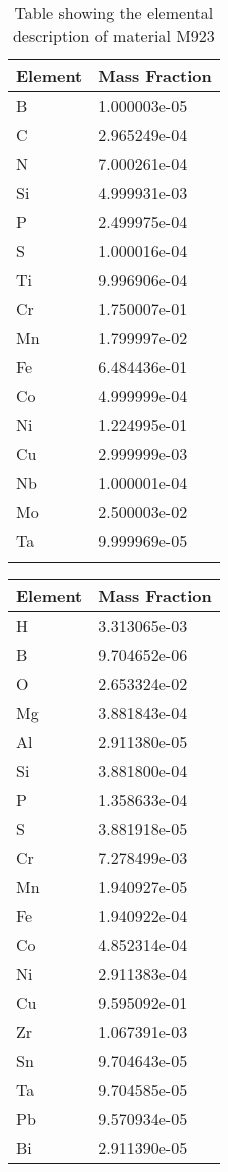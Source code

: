\begin{centering}
\begin{longtable}[ht!]
\caption{Table showing the elemental description of material M937}
\label{table:material_UppWaterPipes}
\end{longtable}
\clearpage

\begin{longtable}[ht!]
{ p{} | p{} }
\hline
Element & Mass Fraction\\
\hline
B &  1.000003e-05\\
C &  2.965249e-04\\
N &  7.000261e-04\\
Si &  4.999931e-03\\
P &  2.499975e-04\\
S &  1.000016e-04\\
Ti &  9.996906e-04\\
Cr &  1.750007e-01\\
Mn &  1.799997e-02\\
Fe &  6.484436e-01\\
Co &  4.999999e-04\\
Ni &  1.224995e-01\\
Cu &  2.999999e-03\\
Nb &  1.000001e-04\\
Mo &  2.500003e-02\\
Ta &  9.999969e-05\\

\caption{Table showing the elemental description of material M923}
\label{table:material_EppValves}
\end{longtable}
\clearpage

\begin{longtable}[ht!]
{ p{} | p{} }
\hline
Element & Mass Fraction\\
\hline

H &  3.313065e-03\\
B &  9.704652e-06\\
O &  2.653324e-02\\
Mg &  3.881843e-04\\
Al &  2.911380e-05\\
Si &  3.881800e-04\\
P &  1.358633e-04\\
S &  3.881918e-05\\
Cr &  7.278499e-03\\
Mn &  1.940927e-05\\
Fe &  1.940922e-04\\
Co &  4.852314e-04\\
Ni &  2.911383e-04\\
Cu &  9.595092e-01\\
Zr &  1.067391e-03\\
Sn &  9.704643e-05\\
Ta &  9.704585e-05\\
Pb &  9.570934e-05\\
Bi &  2.911390e-05\\


\end{longtable}
\end{centering}
